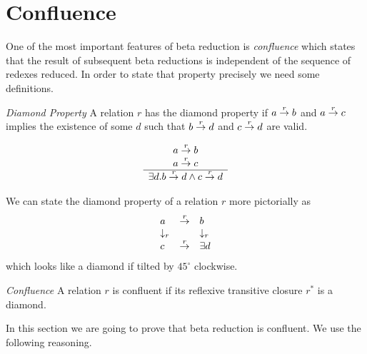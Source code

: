 \section{Confluence}

One of the most important features of beta reduction is \emph{confluence} which
states that the result of subsequent beta reductions is independent of the
sequence of redexes reduced. In order to state that property precisely we need
some definitions.

\begin{definition}
    \emph{Diamond Property} A relation $r$ has the diamond property if $a
    \stackrel{r}{\to} b$ and $a \stackrel{r}{\to} c$ implies the existence of some $d$ such that
    $b \stackrel{r}{\to} d$ and $c \stackrel{r}{\to} d$ are valid.

    $$
    \begin{array}{c} 
        a \stackrel{r}{\to} b
        \\
        a \stackrel{r}{\to} c
     \\ \hline 
        \exists d. b \stackrel{r}{\to} d \land c \stackrel{r}{\to} d
    \end{array}
    $$
\end{definition}

We can state the diamond property of a relation $r$ more pictorially as
$$
\begin{array}{lll}
    a   &  \stackrel{r}{\to} &   b
    \\
    \downarrow_r & & \downarrow_r
    \\
    c & \stackrel{r}{\to} & \exists d
\end{array}
$$
which looks like a diamond if tilted by $45^\circ$ clockwise.


\begin{definition}
    \emph{Confluence} A relation $r$ is confluent if its reflexive transitive
    closure $r^*$ is a diamond.
\end{definition}


In this section we are going to prove that beta reduction is confluent. We use
the following reasoning.

